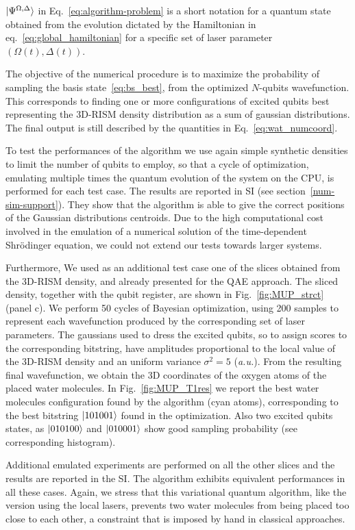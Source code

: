 \documentclass[fleqn,10pt]{wlscirep}
\begin{document}
$\ket{\Psi^{\Omega,\Delta}}$ in Eq.~\eqref{eq:algorithm-problem} is a short notation for a quantum state obtained from the evolution dictated by the Hamiltonian in eq.~\eqref{eq:global_hamiltonian} for a specific set of laser parameter $(\Omega(t),\Delta(t))$.

The objective of the numerical procedure is to maximize the probability of sampling the basis state~\eqref{eq:bs_best}, from the optimized $N$-qubits wavefunction. This corresponds to finding one or more configurations of excited qubits best representing the 3D-RISM density distribution as a sum of gaussian distributions. The final output is still described by the quantities in Eq.~\eqref{eq:wat_numcoord}.


To test the performances of the algorithm we use again simple synthetic densities to limit the number of qubits to employ, so that a cycle of optimization, emulating multiple times the quantum evolution of the system on the CPU, is performed for each test case.
The results are reported in SI (see section~\ref{num-sim-support}). They show that the algorithm is able to give the correct positions of the Gaussian distributions centroids. Due to the high computational cost involved in the emulation of a numerical solution of the time-dependent Shr{\"o}dinger equation, we could not extend our tests towards larger systems. 


Furthermore, We used as an additional test case one of the slices obtained from the 3D-RISM density, and already presented for the QAE approach. The sliced density, together with the qubit register, are shown in Fig.~\ref{fig:MUP_strct} (panel c). We perform 50 cycles of Bayesian optimization, using 200 samples to represent each wavefunction produced by the corresponding set of laser parameters. The gaussians used to dress the excited qubits, so to assign scores to the corresponding bitstring, have amplitudes proportional to the local value of the 3D-RISM density and an uniform variance $\sigma^{2} = 5$ (\textit{a.u.}).
From the resulting final wavefunction, we obtain the 3D coordinates of the oxygen atoms of the placed water molecules. In Fig.~\ref{fig:MUP_T1res} we report the best water molecules configuration found by the algorithm (cyan atoms), corresponding to the best bitstring $\ket{101001}$ found in the optimization. Also two excited qubits states, as $\ket{010100}$ and $\ket{010001}$ show good sampling probability (see corresponding histogram). 




Additional emulated experiments are performed on all the other slices and the results are reported in the SI. The algorithm exhibits equivalent performances in all these cases. Again, we stress that this variational quantum algorithm, like the version using the local lasers, prevents two water molecules from being placed too close to each other, a constraint that is imposed by hand in classical approaches. 
\end{document}
